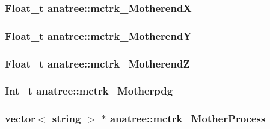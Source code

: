 \hypertarget{classanatree_ae629fee906b17c4ca344da2584185597}{
\subsubsection[{mctrk\-\_\-\-Motherend\-X}]{\setlength{\rightskip}{0pt plus 5cm}Float\-\_\-t anatree\-::mctrk\-\_\-\-Motherend\-X}}\label{classanatree_ae629fee906b17c4ca344da2584185597}
\hypertarget{classanatree_a8fff5a031986dba3d08518a592ca27c3}{
\subsubsection[{mctrk\-\_\-\-Motherend\-Y}]{\setlength{\rightskip}{0pt plus 5cm}Float\-\_\-t anatree\-::mctrk\-\_\-\-Motherend\-Y}}\label{classanatree_a8fff5a031986dba3d08518a592ca27c3}
\hypertarget{classanatree_a5b480d24c2601b0edafa2927e2da7935}{
\subsubsection[{mctrk\-\_\-\-Motherend\-Z}]{\setlength{\rightskip}{0pt plus 5cm}Float\-\_\-t anatree\-::mctrk\-\_\-\-Motherend\-Z}}\label{classanatree_a5b480d24c2601b0edafa2927e2da7935}
\hypertarget{classanatree_a29ed34336b58343e063896bdb0e8af5b}{
\subsubsection[{mctrk\-\_\-\-Motherpdg}]{\setlength{\rightskip}{0pt plus 5cm}Int\-\_\-t anatree\-::mctrk\-\_\-\-Motherpdg}}\label{classanatree_a29ed34336b58343e063896bdb0e8af5b}
\hypertarget{classanatree_a1b9d799bba5001e7e69a479c579facdc}{
\subsubsection[{mctrk\-\_\-\-Mother\-Process}]{\setlength{\rightskip}{0pt plus 5cm}vector$<$ string $>$ $\ast$ anatree\-::mctrk\-\_\-\-Mother\-Process}}\label{classanatree_a1b9d799bba5001e7e69a479c579facdc}
